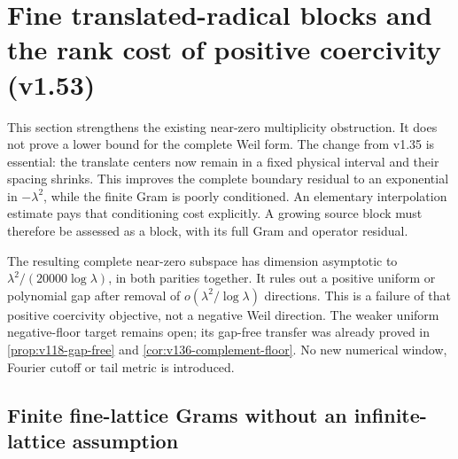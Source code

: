 \section{Fine translated-radical blocks and the rank cost of positive coercivity (v1.53)}
\label{sec:v153-fine-block}
This section strengthens the existing near-zero multiplicity obstruction.
It does not prove a lower bound for the complete Weil form. The change
from v1.35 is essential: the translate centers now remain in a fixed
physical interval and their spacing shrinks. This improves the complete
boundary residual to an exponential in $-\lambda^2$, while the finite
Gram is poorly conditioned. An elementary interpolation estimate pays
that conditioning cost explicitly. A growing source block must therefore
be assessed as a block, with its full Gram and operator residual.

The resulting complete near-zero subspace has dimension asymptotic to
$\lambda^2/(20000\log\lambda)$, in both parities together. It rules out
a positive uniform or polynomial gap after removal of
$o(\lambda^2/\log\lambda)$ directions. This is a failure of that positive
coercivity objective, not a negative Weil direction. The weaker uniform
negative-floor target remains open; its gap-free transfer was already
proved in \ref{prop:v118-gap-free} and \ref{cor:v136-complement-floor}.
No new numerical window, Fourier cutoff or tail metric is introduced.

\subsection*{Finite fine-lattice Grams without an infinite-lattice assumption}

